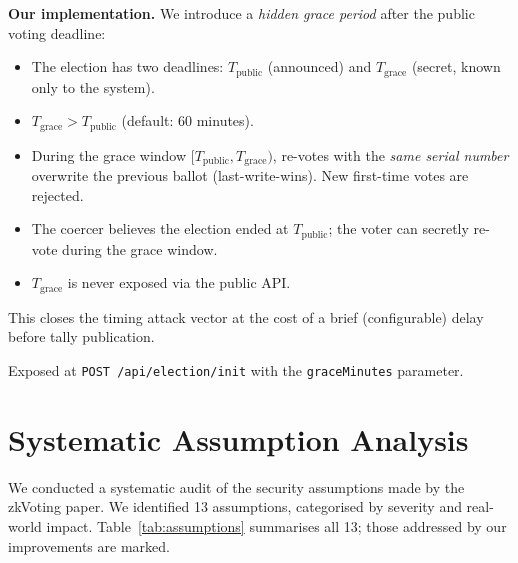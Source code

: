 \documentclass[conference]{IEEEtran}
\begin{document}
\textbf{Our implementation.}
We introduce a \emph{hidden grace period} after the public voting deadline:
\begin{itemize}
  \item The election has two deadlines: $T_{\mathrm{public}}$ (announced) and
    $T_{\mathrm{grace}}$ (secret, known only to the system).
  \item $T_{\mathrm{grace}} > T_{\mathrm{public}}$ (default: 60 minutes).
  \item During the grace window $[T_{\mathrm{public}}, T_{\mathrm{grace}})$,
    re-votes with the \emph{same serial number} overwrite the previous ballot
    (last-write-wins).  New first-time votes are rejected.
  \item The coercer believes the election ended at $T_{\mathrm{public}}$;
    the voter can secretly re-vote during the grace window.
  \item $T_{\mathrm{grace}}$ is never exposed via the public API.
\end{itemize}

This closes the timing attack vector at the cost of a brief (configurable)
delay before tally publication.

Exposed at \texttt{POST /api/election/init} with the \texttt{graceMinutes}
parameter.

\section{Systematic Assumption Analysis}
\label{sec:assumptions}

We conducted a systematic audit of the security assumptions made by the
zkVoting paper.  We identified 13 assumptions, categorised by severity and
real-world impact.  Table~\ref{tab:assumptions} summarises all 13; those
addressed by our improvements are marked.
\end{document}
